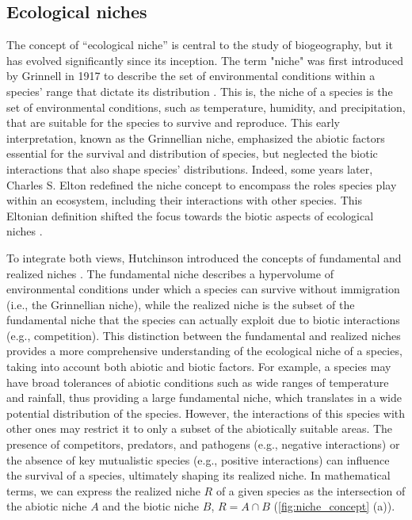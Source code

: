 \subsection{\label{sec:Ecological niches} Ecological niches}

The concept of ``ecological niche'' is central to the study of biogeography,
but it has evolved significantly since its inception. The term "niche" was
first introduced by Grinnell in 1917 to describe the set of environmental
conditions within a species' range that dictate its distribution
\cite{Grinnell1917}. This is, the niche of a species is the set of
environmental conditions, such as temperature, humidity, and precipitation,
that are suitable for the species to survive and reproduce. This early
interpretation, known as the Grinnellian niche, emphasized the abiotic
factors essential for the survival and distribution of species, but neglected
the biotic interactions that also shape species' distributions. Indeed, some
years later, Charles S. Elton redefined the niche concept to encompass the
roles
species play within an ecosystem, including their interactions with other
species. This Eltonian definition shifted the focus towards the biotic
aspects of ecological niches \cite{Elton1927}.

To integrate both views, Hutchinson introduced the concepts of
fundamental and realized niches \cite{Hutchinson1957}. The fundamental niche
describes a hypervolume of environmental conditions under which a species can
survive without immigration (i.e., the Grinnellian niche), while the realized
niche is the subset of the fundamental niche that the species can actually
exploit due to biotic interactions (e.g., competition). This distinction
between the fundamental and realized niches provides a more comprehensive
understanding of the ecological niche of a species, taking into account both
abiotic and biotic factors. For example, a species may have broad tolerances of
abiotic conditions such as wide ranges of temperature and rainfall, thus
providing a large fundamental niche, which translates in a wide potential
distribution of the species. However, the interactions of this species with
other ones may restrict it to only a subset of the abiotically suitable areas.
The presence of competitors, predators, and pathogens (e.g., negative
interactions) or the absence of key mutualistic species (e.g., positive
interactions) can influence the survival of a species, ultimately shaping its
realized niche. In mathematical terms, we can express the realized niche $R$ of
a given species as the intersection of the abiotic niche $A$ and the biotic
niche $B$, $R=A\cap B$ (\cref{fig:niche_concept} (a)).


